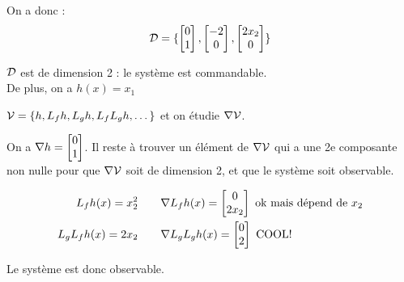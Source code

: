 \documentclass{../../td}{subfiles}
\begin{document}
\begin{enumerate}
On a donc : \[ \mathcal{D} = \{\begin{bmatrix} 0 \\ 1 \end{bmatrix}, \begin{bmatrix} -2 \\ 0 \end{bmatrix}, \begin{bmatrix} 2x_2 \\ 0 \end{bmatrix}\} \]

$\mathcal{D}$ est de dimension 2 : le système est commandable.\\

De plus, on a $h(x) = x_1$

$\mathcal{V} = \{h,L_fh,L_gh,L_fL_gh,\dots \}$ et on étudie $\nabla \mathcal{V}$.

On a $\nabla h = \begin{bmatrix} 0 \\ 1 \end{bmatrix}$. Il reste à trouver un élément de $\nabla \mathcal{V}$ qui a une 2e composante non nulle pour que $\nabla \mathcal{V}$ soit de dimension 2, et que le système soit observable.

\begin{align*}
L_fh(x) = x_2^2 \quad & \quad \nabla L_fh(x) = \begin{bmatrix} 0\\2x_2 \end{bmatrix} \text{ ok mais dépend de $x_2$}\\
L_gL_fh(x) = 2x_2 \quad & \quad \nabla L_gL_gh(x) = \begin{bmatrix} 0 \\ 2 \end{bmatrix} \text{ COOL!}
\end{align*}

Le système est donc observable.
\end{enumerate}
\end{document}
